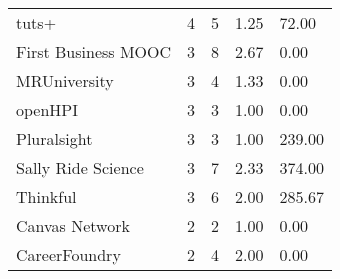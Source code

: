 \documentclass[
	a4paper,
	pdftex,
	12pt,	
	footinclude=true,
	fleqn,
	final,
	]{report}%
\begin{document}
\begin{table}[h]
{\begin{tabular}{m{7cm} m{2.3cm} m{2.3cm} m{2.3cm} m{2.3cm}}
tuts+                         & 4                                                    & 5                                                     & 1.25                                                     & 72.00                                                    \\
First Business MOOC           & 3                                                    & 8                                                     & 2.67                                                     & 0.00                                                     \\
MRUniversity                  & 3                                                    & 4                                                     & 1.33                                                     & 0.00                                                     \\
openHPI                       & 3                                                    & 3                                                     & 1.00                                                     & 0.00                                                     \\
Pluralsight                   & 3                                                    & 3                                                     & 1.00                                                     & 239.00                                                   \\
Sally Ride Science            & 3                                                    & 7                                                     & 2.33                                                     & 374.00                                                   \\
Thinkful                      & 3                                                    & 6                                                     & 2.00                                                     & 285.67                                                   \\
Canvas Network                & 2                                                    & 2                                                     & 1.00                                                     & 0.00                                                     \\
CareerFoundry                 & 2                                                    & 4                                                     & 2.00                                                     & 0.00                                                     \\

\end{tabular}}
\end{table}
\end{document}

